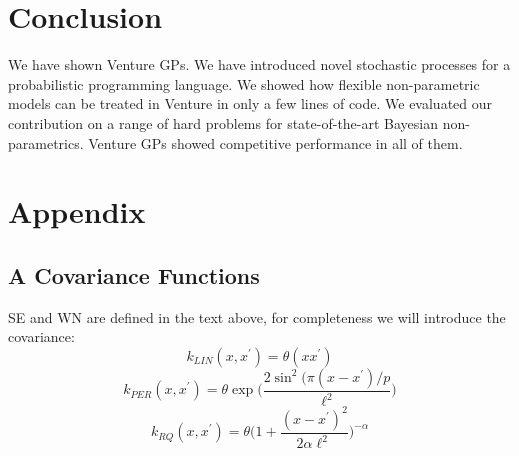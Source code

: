 \documentclass{article} %
\newcommand{\emu}{{\textrm{emu}}}
\begin{document}

\FloatBarrier
\section{Conclusion}
We have shown Venture GPs. We have introduced novel stochastic processes for a probabilistic programming language. We showed how flexible non-parametric models can be treated in Venture in only a few lines of code. We evaluated our contribution on a range of hard problems for state-of-the-art Bayesian non-parametrics. Venture GPs showed competitive performance in all of them. 

\section*{Appendix}
\subsection*{A Covariance Functions}
SE and WN are defined in the text above, for completeness we will introduce the covariance:
\begin{equation}
k_{LIN}(x,x^\prime) = \theta (x x^\prime) 
\end{equation}
\begin{equation}
k_{PER}(x,x^\prime) = \theta \exp \bigg( \frac{2 \sin^2 ( \pi (x - x^\prime)/p}{\ell^2} \bigg) 
\end{equation}
\begin{equation}
k_{RQ}(x,x^\prime) =   \theta \bigg(1 + \frac{(x - x^\prime)^2}{2 \alpha \ell^2} \bigg)^{-\alpha}
\end{equation}
\end{document}
